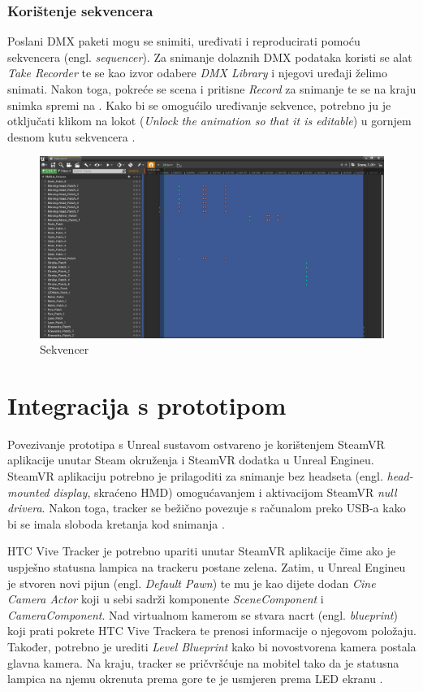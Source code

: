 \documentclass[times, utf8, zavrsni, numeric]{fer}
\begin{document}
\subsection{Korištenje sekvencera}
Poslani DMX paketi mogu se snimiti, uređivati i reproducirati pomoću sekvencera (engl. \emph{sequencer}). Za snimanje dolaznih DMX podataka koristi se alat \emph{Take Recorder} te se kao izvor odabere \emph{DMX Library} i njegovi uređaji želimo snimati. Nakon toga, pokreće se scena i pritisne \emph{Record} za snimanje te se na kraju snimka spremi na . Kako bi se omogućilo uređivanje sekvence, potrebno ju je otključati klikom na lokot (\emph{Unlock the animation so that it is editable}) u gornjem desnom kutu sekvencera \cite{dmx_tracks}.\\

\begin{figure}[htp]
	\centering
	\includegraphics[width=\linewidth]{slika 6-12.png}
	\caption{Sekvencer}
	\label{fig:slika 6-12}
\end{figure}

\chapter{Integracija s prototipom}
Povezivanje prototipa s Unreal sustavom ostvareno je korištenjem SteamVR aplikacije unutar Steam okruženja i SteamVR dodatka u Unreal Engineu. SteamVR aplikaciju potrebno je prilagoditi za snimanje bez headseta (engl. \emph{head-mounted display}, skraćeno HMD) omogućavanjem i aktivacijom SteamVR \emph{null drivera}. Nakon toga, tracker se bežično povezuje s računalom preko USB-a kako bi se imala sloboda kretanja kod snimanja \cite{vp}. \newline

HTC Vive Tracker je potrebno upariti unutar SteamVR aplikacije čime ako je uspješno statusna lampica na trackeru postane zelena. Zatim, u Unreal Engineu je stvoren novi pijun (engl. \emph{Default Pawn}) te mu je kao dijete dodan \emph{Cine Camera Actor} koji u sebi sadrži komponente \emph{SceneComponent} i \emph{CameraComponent}. Nad virtualnom kamerom se stvara nacrt (engl. \emph{blueprint}) koji prati pokrete HTC Vive Trackera te prenosi informacije o njegovom položaju. Također, potrebno je urediti \emph{Level Blueprint} kako bi novostvorena kamera postala glavna kamera. Na kraju, tracker se pričvršćuje na mobitel tako da je statusna lampica na njemu okrenuta prema gore te je usmjeren prema LED ekranu \cite{vp}. \newline
\end{document}

